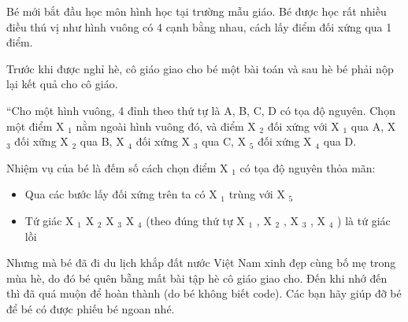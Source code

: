 Bé mới bắt đầu học môn hình học tại trường mẫu giáo. Bé được học rất nhiều điều thú vị như hình vuông có 4 cạnh bằng nhau, cách lấy điểm đối xứng qua 1 điểm.  

   Trước khi được nghỉ hè, cô giáo giao cho bé một bài toán và sau hè bé phải nộp lại kết quả cho cô giáo.  

   “Cho một hình vuông, 4 đỉnh theo thứ tự là A, B, C, D có tọa độ nguyên. Chọn một điểm X   $_    1   $   nằm ngoài hình vuông đó, và điểm X   $_    2   $   đối xứng với X   $_    1   $   qua A, X   $_    3   $   đối xững X   $_    2   $   qua B, X   $_    4   $   đối xứng X   $_    3   $   qua C, X   $_    5   $   đối xứng X   $_    4   $   qua D.  

   Nhiệm vụ của bé là đếm số cách chọn điểm X   $_    1   $   có tọa độ nguyên thỏa mãn:  
\begin{itemize}
	\item     Qua các bước lấy đối xứng trên ta có X    $_     1    $    trùng với X    $_     5    $
	\item     Tứ giác X    $_     1    $    X    $_     2    $    X    $_     3    $    X    $_     4    $    (theo đúng thứ tự X    $_     1    $    , X    $_     2    $    , X    $_     3    $    , X    $_     4    $    ) là tứ giác lồi   
\end{itemize}

   Nhưng mà bé đã đi du lịch khắp đất nước Việt Nam xinh đẹp cùng bố mẹ trong mùa hè, do đó bé quên bẵng mất bài tập hè cô giáo giao cho. Đến khi nhớ đến thì đã quá muộn để hoàn thành (do bé không biết code). Các bạn hãy giúp đỡ bé để bé có được phiếu bé ngoan nhé.